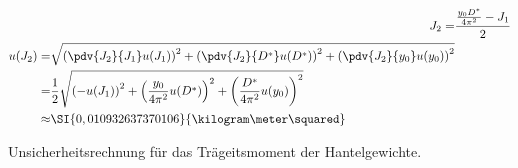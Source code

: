 \begin{figure}[h]
\centering
\begin{align}
J_2 =& \frac{\frac{y_0 D^*}{4 \pi^2} - J_1}{2}\\
\begin{split}
\label{eq:hantel-J2-unc}
u(J_2) =& \sqrt{\left( \pdv{J_2}{J_1} u(J_1) \right) ^2 + \left( \pdv{J_2}{D^*} u(D^*) \right) ^2 + \left( \pdv{J_2}{y_0} u(y_0) \right) ^2}\\
=& \frac{1}{2} \sqrt{\left( -u(J_1) \right) ^2 + \left( \frac{y_0}{4\pi^2} u(D^*) \right) ^2 + \left( \frac{D^*}{4\pi^2} u(y_0) \right) ^2}\\
\approx & \SI{0,010932637370106}{\kilogram\meter\squared}
\end{split}
\end{align}
\caption{Unsicherheitsrechnung für das Trägeitsmoment der Hantelgewichte.}
\end{figure}
